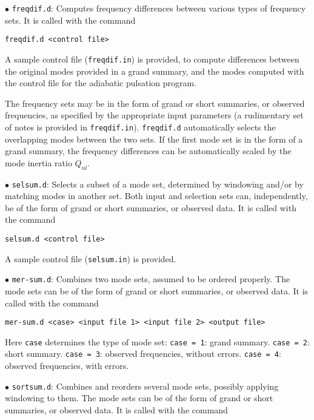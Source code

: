 \medskip
\item{$\bullet$}
{\tt freqdif.d}:
Computes frequency differences between various types of
frequency sets.
It is called with the command

{\tt freqdif.d <control file>}

\item{}
A sample control file ({\tt freqdif.in}) is provided,
to compute differences between the original modes provided
in a grand summary, and the modes computed with the
control file for the adiabatic pulsation program.

\item{}
The frequency sets may be in the form of grand or short summaries,
or observed frequencies, as specified by the appropriate input
parameters (a rudimentary set of notes is provided in
{\tt freqdif.in}).
{\tt freqdif.d} automatically selects the overlapping modes between the
two sets.
If the first mode set is in the form of a grand summary, 
the frequency differences can be automatically scaled by the mode
inertia ratio $Q_{nl}$.

\medskip
\item{$\bullet$}
{\tt selsum.d}:
Selects a subset of a mode set, determined by
windowing  and/or by matching modes in another set.
Both input and selection sets can, independently,
be of the form of grand or short summaries,
or observed data.
It is called with the command

{\tt selsum.d <control file>}

\item{}
A sample control file ({\tt selsum.in}) is provided.

\medskip
\item{$\bullet$}
{\tt mer-sum.d}:
Combines two mode sets, assumed to be ordered properly.
The mode sets can
be of the form of grand or short summaries,
or observed data.
It is called with the command

{\tt mer-sum.d <case> <input file 1> <input file 2> <output file>}

\item{}
Here {\tt case} determines the type of mode set:
\itemitem{--}
{\tt case = 1}: grand summary.
\itemitem{--}
{\tt case = 2}: short summary.
\itemitem{--}
{\tt case = 3}: observed frequencies, without errors.
\itemitem{--}
{\tt case = 4}: observed frequencies, with errors.

\medskip
\item{$\bullet$}
{\tt sortsum.d}:
Combines and reorders several mode sets,
possibly applying windowing to them.
The mode sets can
be of the form of grand or short summaries,
or observed data.
It is called with the command

